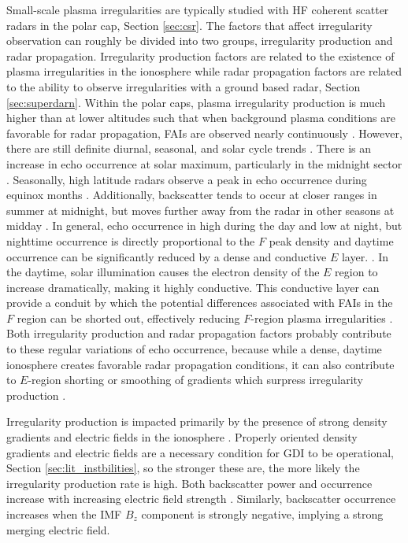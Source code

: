 Small-scale plasma irregularities are typically studied with HF coherent scatter radars in the polar cap, Section \ref{sec:csr}.  The factors that affect irregularity observation can roughly be divided into two groups, irregularity production and radar propagation.  Irregularity production factors are related to the existence of plasma irregularities in the ionosphere while radar propagation factors are related to the ability to observe irregularities with a ground based radar, Section \ref{sec:superdarn}.  Within the polar caps, plasma irregularity production is much higher than at lower altitudes such that when background plasma conditions are favorable for radar propagation, FAIs are observed nearly continuously \citep{Bristow2011}.  However, there are still definite diurnal, seasonal, and solar cycle trends \citep{Kane2012}.  There is an increase in echo occurrence at solar maximum, particularly in the midnight sector \citep{Milan1997,Koustov2004}.  Seasonally, high latitude radars observe a peak in echo occurrence during equinox months \citep{Koustov2004}.  Additionally, backscatter tends to occur at closer ranges in summer at midnight, but moves further away from the radar in other seasons at midday \citep{Milan1997}.  In general, echo occurrence in high during the day and low at night, but nighttime occurrence is directly proportional to the \(F\) peak density and daytime occurrence can be significantly reduced by a dense and conductive \(E\) layer. \citep{Koustov2004,Kane2012,Vickrey1982}.  In the daytime, solar illumination causes the electron density of the \(E\) region to increase dramatically, making it highly conductive.  This conductive layer can provide a conduit by which the potential differences associated with FAIs in the \(F\) region can be shorted out, effectively reducing \(F\)-region plasma irregularities \citep{Vickrey1982}.  Both irregularity production and radar propagation factors probably contribute to these regular variations of echo occurrence, because while a dense, daytime ionosphere creates favorable radar propagation conditions, it can also contribute to \(E\)-region shorting or smoothing of gradients which surpress irregularity production \citep{Koustov2004}.  

Irregularity production is impacted primarily by the presence of strong density gradients and electric fields in the ionosphere \citep{Koustov2004}.  Properly oriented density gradients and electric fields are a necessary condition for GDI to be operational, Section \ref{sec:lit_instbilities}, so the stronger these are, the more likely the irregularity production rate is high.  Both backscatter power and occurrence increase with increasing electric field strength \citep{Ballatore2001,Danskin2002,Makarevich2014b}.  Similarly, backscatter occurrence increases when the IMF \(B_z\) component is strongly negative, implying a strong merging electric field.

